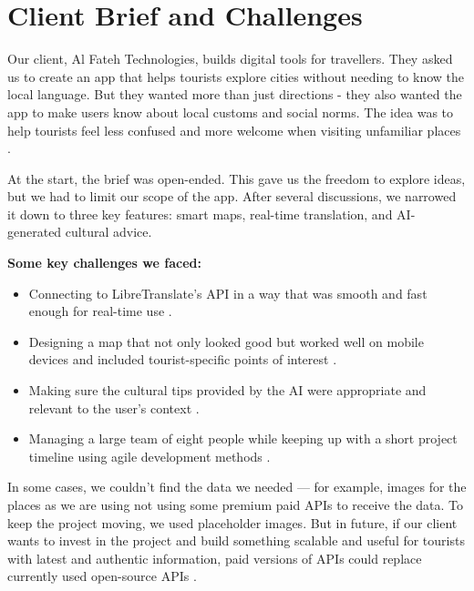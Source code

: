 \section{Client Brief and Challenges}

Our client, Al Fateh Technologies, builds digital tools for travellers. They asked us to create an app that helps tourists explore cities without needing to know the local language. But they wanted more than just directions - they also wanted the app to make users know about local customs and social norms. The idea was to help tourists feel less confused and more welcome when visiting unfamiliar places \cite{culturegap}.

At the start, the brief was open-ended. This gave us the freedom to explore ideas, but we had to limit our scope of the app. After several discussions, we narrowed it down to three key features: smart maps, real-time translation, and AI-generated cultural advice.

\textbf{Some key challenges we faced:}
\begin{itemize}
  \item Connecting to LibreTranslate’s API in a way that was smooth and fast enough for real-time use \cite{libretranslate}.
  \item Designing a map that not only looked good but worked well on mobile devices and included tourist-specific points of interest \cite{uxTourism}.
  \item Making sure the cultural tips provided by the AI were appropriate and relevant to the user’s context \cite{aiBias}.
  \item Managing a large team of eight people while keeping up with a short project timeline using agile development methods \cite{agileTeams}.
\end{itemize}

In some cases, we couldn’t find the data we needed — for example, images for the places as we are using not using some premium paid APIs to receive the data. To keep the project moving, we used placeholder images. But in future, if our client wants to invest in the project and build something scalable and useful for tourists with latest and authentic information, paid versions of APIs could replace currently used open-source APIs \cite{crowdsourcing}.